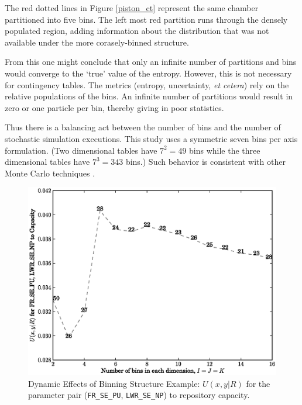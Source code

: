 The red dotted lines in Figure \ref{piston_ct} represent the same chamber partitioned into 
five bins.  The left most red partition runs through the
densely populated region, adding information about the distribution that was not available 
under the more corasely-binned structure.

From this one might conclude that only an infinite number of partitions and bins would converge 
to the `true' value of the entropy.  However, this is not necessary for contingency tables.  
The metrics (entropy, uncertainty, \emph{et cetera}) rely on the relative populations of the bins.
An infinite number of partitions would result in zero or one particle per bin, thereby 
giving in poor statistics.

Thus there is a balancing act between the number of bins and the number of stochastic 
simulation executions.  This study uses a symmetric seven bins per axis formulation.  
(Two dimensional tables have $7^2=49$ bins while the three dimensional tables have
$7^3=343$ bins.)
Such behavior is consistent with other Monte Carlo techniques \cite{Press2007}.

\begin{figure}[htbp]
\begin{center}
\includegraphics[scale=0.70]{ct_sensitivity/figs/U_xy_R_for_FR_SE_PU_and_LWR_SE_NP_to_Capacity_rank.eps}
\caption{Dynamic Effects of Binning Structure Example: $U(x,y|R)$ for the parameter pair (\texttt{FR\_SE\_PU}, \texttt{LWR\_SE\_NP}) to repository capacity.}
\label{dynamic_effects}
\end{center}
\end{figure}

